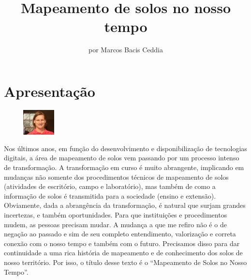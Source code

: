 \title{Mapeamento de solos no nosso tempo}
\author{por Marcos Bacis Ceddia}
\maketitle
\section{Apresentação}
\begin{figure}
 \includegraphics[width=0.15\textwidth]{figuras/bacis}
\end{figure}
Nos últimos anos, em função do desenvolvimento e disponibilização de tecnologias digitais, a área de mapeamento de solos vem passando por um processo intenso de transformação. A transformação em curso é muito abrangente, implicando em mudanças não somente dos procedimentos técnicos de mapeamento de solos (atividades de escritório, campo e laboratório), mas também de como a informação de solos é transmitida para a sociedade (ensino e extensão). Obviamente, dada a abrangência da transformação, é natural que surjam grandes incertezas, e também oportunidades. Para que instituições e procedimentos mudem, as pessoas precisam mudar. A mudança a que me refiro não é o de negação ao passado e sim de seu completo entendimento, valorização e correta conexão com o nosso tempo e também com o futuro. Precisamos disso para dar continuidade a uma rica história de mapeamento e de conhecimento dos solos de nosso território. Por isso, o título desse texto é o ``Mapeamento de Solos no Nosso Tempo''.
